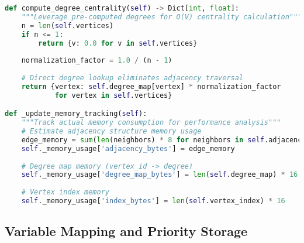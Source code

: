 \begin{lstlisting}[language=Python, caption=Memory-Optimized Degree Centrality Computation]
def compute_degree_centrality(self) -> Dict[int, float]:
    """Leverage pre-computed degrees for O(V) centrality calculation"""
    n = len(self.vertices)
    if n <= 1:
        return {v: 0.0 for v in self.vertices}
    
    normalization_factor = 1.0 / (n - 1)
    
    # Direct degree lookup eliminates adjacency traversal
    return {vertex: self.degree_map[vertex] * normalization_factor 
            for vertex in self.vertices}

def _update_memory_tracking(self):
    """Track actual memory consumption for performance analysis"""
    # Estimate adjacency structure memory usage
    edge_memory = sum(len(neighbors) * 8 for neighbors in self.adjacency.values())
    self._memory_usage['adjacency_bytes'] = edge_memory
    
    # Degree map memory (vertex_id -> degree)
    self._memory_usage['degree_map_bytes'] = len(self.degree_map) * 16
    
    # Vertex index memory
    self._memory_usage['index_bytes'] = len(self.vertex_index) * 16
\end{lstlisting}

\subsection{Variable Mapping and Priority Storage}
\label{appendix:variable-mapping}

